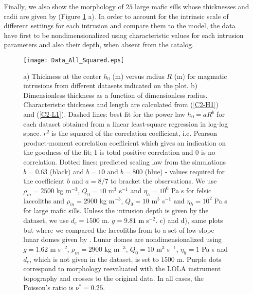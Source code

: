 Finally, we also  show the morphology of $25$ large  mafic sills whose
thicknesses  and   radii  are   given  by   \citet{Cruden:tg}  (Figure
\ref{C2-Corry_Rocchie}  a).  In  order  to account  for the  intrinsic
scale of different settings for each intrusion and compare them to the
model,   the  data   have   first  to   be  nondimensionalized   using
characteristic  values for  each intrusion  parameters and  also their
depth, when absent from the catalog.

\begin{figure}[htpb]
  \begin{center}
    \graphicspath{ {/Users/thorey/Documents/These/Projet/Refroidissement/Skin_Model/Figure/Figure_Data/} }
    \texttt{[image: Data\_All\_Squared.eps]}
    \caption{a) Thickness  at the center  $h_0$ (m) versus  radius $R$
      (m) for magmatic intrusions from different datasets indicated on
      the  plot.    b)  Dimensionless  thickness  as   a  function  of
      dimensionless  radius. Characteristic  thickness and  length are
      calculated from (\ref{C2-H1})  and (\ref{C2-L1}).  Dashed lines:
      best fit for the power  law $h_0=aR^b$ for each dataset obtained
      from a linear least-square regression in log-log space. $r^2$ is
      the  squared  of  the  correlation  coefficient,  i.e.   Pearson
      product-moment correlation coefficient which gives an indication
      on the  goodness of the  fit; $1$ is total  positive correlation
      and $0$ is  no correlation. Dotted lines:  predicted scaling law
      from  the simulations  $b=0.63$ (black)  and $b=10$  and $b=800$
      (blue) - values required for  the coefficient $b$ and $a=8/7$ to
      bracket  the observations.   We use  $\rho_m=2500$ kg  m$^{-3}$,
      $Q_0  =10$ m$^3$  s$^{-1}$  and $\eta_h=10^6$  Pa  s for  felsic
      laccoliths  and  $\rho_m=2900$  kg  m$^{-3}$,  $Q_0  =10$  m$^3$
      s$^{-1}$ and $\eta_h=10^2$  Pa s for large  mafic sills.  Unless
      the intrusion depth  is given by the dataset,  we use $d_c=1500$
      m.  $g=9.81$  m s$^{-2}$.  c)  and d),  same plots but  where we
      compared the  laccoliths from \citet{Rocchi:2002jy} to  a set of
      low-slope  lunar domes  given  by \citet{Wohler:2009jj}.   Lunar
      domes   are  nondimensionalized   using  $g=1.62$   m  s$^{-2}$,
      $\rho_m=2900$ kg m$^{-3}$, $Q_0  =10$ m$^3$ s$^{-1}$, $\eta_h=1$
      Pa s  and $d_c$, which  is not given in  the dataset, is  set to
      $1500$ m. Purple dots  correspond to morphology reevaluated with
      the  LOLA  instrument topography  and  crosses  to the  original
      data. In all cases, the Poisson's ratio is $\nu^*=0.25$.}
    \label{C2-Corry_Rocchie}
  \end{center}
\end{figure}

